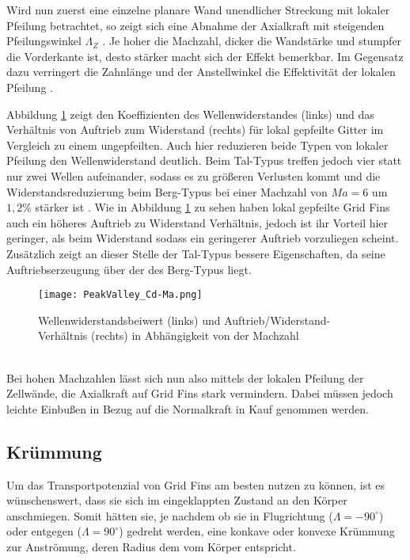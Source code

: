 Wird nun zuerst eine einzelne planare Wand unendlicher Streckung mit lokaler Pfeilung betrachtet, so zeigt sich eine Abnahme der Axialkraft mit steigenden Pfeilungswinkel $\Lambda_Z$ \cite{PeakValley}. Je hoher die Machzahl, dicker die Wandstärke und stumpfer die Vorderkante ist, desto stärker macht sich der Effekt bemerkbar. Im Gegensatz dazu verringert die Zahnlänge und der Anstellwinkel die Effektivität der lokalen Pfeilung \cite{PeakValley}.

Abbildung \ref{abb_PeakValley-Ma} zeigt den Koeffizienten des Wellenwiderstandes (links) und das Verhältnis von Auftrieb zum Widerstand (rechts) für lokal gepfeilte Gitter im Vergleich zu einem ungepfeilten.
Auch hier reduzieren beide Typen von lokaler Pfeilung den Wellenwiderstand deutlich. Beim Tal-Typus treffen jedoch vier statt nur zwei Wellen aufeinander, sodass es zu größeren Verlusten kommt und die Widerstandsreduzierung beim Berg-Typus bei einer Machzahl von $Ma=6$ um $1,2\%$ stärker ist \cite{PeakValley}.
Wie in Abbildung \ref{abb_PeakValley-Ma} zu sehen haben lokal gepfeilte Grid Fins auch ein höheres Auftrieb zu Widerstand Verhältnis, jedoch ist ihr Vorteil hier geringer, als beim Widerstand sodass ein geringerer Auftrieb vorzuliegen scheint. Zusätzlich zeigt an dieser Stelle der Tal-Typus bessere Eigenschaften, da seine Auftriebserzeugung über der des Berg-Typus liegt. 
\begin{figure}[h]
	\centering
	\texttt{[image: PeakValley\_Cd-Ma.png]}
	\begin{flushright}
	\end{flushright}
	\caption{Wellenwiderstandsbeiwert (links) und Auftrieb/Widerstand-Verhältnis (rechts) in Abhängigkeit von der Machzahl}
	\label{abb_PeakValley-Ma}
\end{figure}\\
Bei hohen Machzahlen lässt sich nun also mittels der lokalen Pfeilung der Zellwände, die Axialkraft auf Grid Fins stark vermindern. Dabei müssen jedoch leichte Einbußen in Bezug auf die Normalkraft in Kauf genommen werden.
\subsection{Krümmung}
Um das Transportpotenzial von Grid Fins am besten nutzen zu können, ist es wünschenswert, dass sie sich im eingeklappten Zustand an den Körper anschmiegen. Somit hätten sie, je nachdem ob sie in Flugrichtung ($\Lambda = -90^\circ$) oder entgegen ($\Lambda = 90^\circ$) gedreht werden, eine konkave oder konvexe Krümmung zur Anströmung, deren Radius dem vom Körper entspricht.

